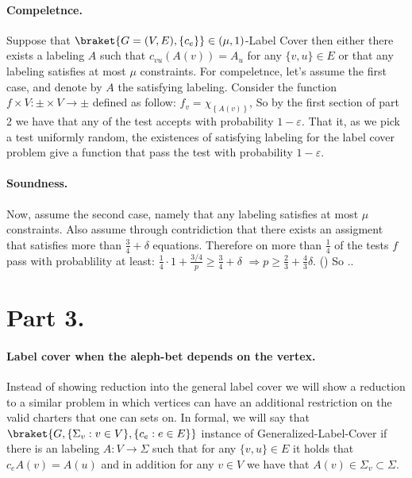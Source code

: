\documentclass{article}
\newcommand{\Chi}[1]{\chi_{ \left\{ #1  \right\} } }
\begin{document}
\paragraph{Compeletnce. } Suppose that $\braket{G=(V,E), \{ c_{e} \} } \in (\mu,1)$-Label Cover then either there exists a labeling $A$ such that $c_{vu}(A(v)) = A_{u}$ for any $\{v,u\}\in E$ or that any labeling satisfies at most $\mu$ constraints. For compeletnce, let's assume the first case, and denote by $A$ the satisfying labeling. Consider the function $f \times V : \pm \times V \rightarrow \pm$ defined as follow: $f_{v} = \Chi{A(v)}$, So by the first section of part 2 we have that any of the test accepts with probability $1-\varepsilon$. That it, as we pick a test uniformly random, the existences of satisfying labeling for the label cover problem give a function that pass the test with probability $1-\varepsilon$. 
\paragraph{Soundness.}  Now, assume the second case, namely that any labeling satisfies at most $\mu$ constraints. Also assume through contridiction that there exists an assigment that satisfies more than $\frac{3}{4}+\delta$ equations. Therefore on more than $\frac{1}{4}$ of the tests $f$ pass with probablility at least: $\frac{1}{4}\cdot 1 + \frac{3/4}p   \ge \frac{3}{4} + \delta$ $\Rightarrow p \ge \frac{2}{3} +\frac{4}{3} \delta$. () So ..  
\section{Part 3.}

\paragraph{Label cover when the aleph-bet depends on the vertex.} Instead of showing reduction into the general label cover we will show a reduction to a similar problem in which vertices can have an additional restriction on the valid charters that one can sets on. In formal, we will say that $\braket{G, \{ \Sigma_{v} : v \in V \}, \{c_{e} : e \in E \}} $ instance of Generalized-Label-Cover if there is an labeling $A : V \rightarrow \Sigma$ such that for any $\{v,u\} \in E$ it holds that $c_{e}A(v) = A(u)$ and in addition for any $v \in V$ we have that $A(v) \in \Sigma_{v} \subset \Sigma$.  
\end{document}
